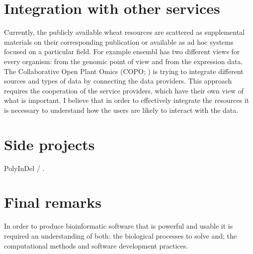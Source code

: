 \section{Integration with other services}
Currently, the publicly available wheat resources are scattered as supplemental materials on their corresponding publication or available as ad hoc systems focused on a particular field.
For example ensembl has two different views for every organism: from the genomic point of view and from the expression data. 
The Collaborative Open Plant Omics (COPO; \citealt{Davey2015}) is trying to integrate different sources and types of data by connecting the data providers. 
This approach requires the cooperation of the service providers, which have their own view of what is important. 
I believe that in order to effectively integrate the resources it is necessary to understand how the users are likely to interact with the data.

\section{Side projects}

PolyInDel / . 

\section{Final remarks}

In order to produce bioinformatic software that is powerful and usable it is required an understanding of both: the biological processes to solve and; the computational methods and software development practices.
